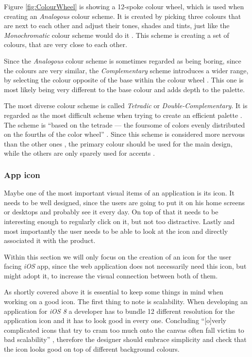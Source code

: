 Figure \vref{fig:ColourWheel} is showing a 12-spoke colour wheel, which is used when creating an \emph{Analogous} colour scheme. It is created by picking three colours that are next to each other and adjust their tones, shades and tints, just like the \emph{Monochromatic} colour scheme would do it \cite{Chapman:2010ab}. This scheme is creating a set of colours, that are very close to each other.

Since the \emph{Analogous} colour scheme is sometimes regarded as being boring, since the colours are very similar, the \emph{Complementary} scheme introduces a wider range, by selecting the colour opposite of the base within the colour wheel \cite{Chapman:2010ab}. This one is most likely being very different to the base colour and adds depth to the palette.

The most diverse colour scheme is called \emph{Tetradic} or \emph{Double-Complementary}. It is regarded as the most difficult scheme when trying to create an efficient palette \cite{Chapman:2010ab}. The scheme is \enquote{based on the tetrade — the foursome of colors evenly distributed on the fourths of the color wheel} \cite{Stanicek:2011aa}. Since this scheme is considered more nervous than the other ones \cite{Stanicek:2011aa}, the primary colour should be used for the main design, while the others are only sparely used for accents \cite{Chapman:2010ab}.

\subsubsection{App icon}
\label{sec:Icon}
Maybe one of the most important visual items of an application is its icon. It needs to be well designed, since the users are going to put it on his home screens or desktops and probably see it every day. On top of that it needs to be interesting enough to regularly click on it, but not too distractive. Lastly and most importantly the user needs to be able to look at the icon and directly associated it with the product. \cite{Flarup:2015aa}

Within this section we will only focus on the creation of an icon for the user facing \emph{iOS} app, since the web application does not necessarily need this icon, but might adopt it, to increase the visual connection between both of them.

As shortly covered above it is essential to keep some things in mind when working on a good icon. The first thing to note is scalability. When developing an application for \emph{iOS 8} a developer has to bundle 12 different resolution for the application icon and it has to look good in every one. Concluding \enquote{[o]verly complicated icons that try to cram too much onto the canvas often fall victim to bad scalability} \cite{Flarup:2015aa}, therefore the designer should embrace simplicity and check that the icon looks good on top of different background colours. \cite{Flarup:2015aa}


